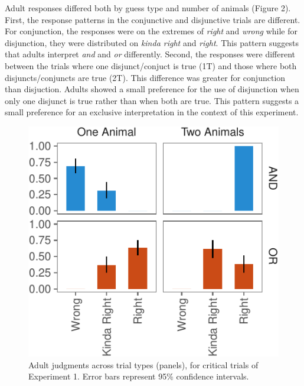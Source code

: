 \documentclass[10pt, letterpaper]{article}
\newenvironment{CodeChunk}{}{}
\begin{document}
Adult responses differed both by guess type and number of animals
(Figure 2). First, the response patterns in the conjunctive and
disjunctive trials are different. For conjunction, the responses were on
the extremes of \emph{right} and \emph{wrong} while for disjunction,
they were distributed on \emph{kinda right} and \emph{right}. This
pattern suggests that adults interpret \emph{and} and \emph{or}
differently. Second, the responses were different between the trials
where one disjunct/conjuct is true (1T) and those where both
disjuncts/conjuncts are true (2T). This difference was greater for
conjunction than disjuction. Adults showed a small preference for the
use of disjunction when only one disjunct is true rather than when both
are true. This pattern suggests a small preference for an exclusive
interpretation in the context of this experiment.

\begin{CodeChunk}
\begin{figure}[t]

{\centering \includegraphics{figs/plot-1} 

}

\caption[Adult judgments across trial types (panels), for critical trials of Experiment 1]{Adult judgments across trial types (panels), for critical trials of Experiment 1. Error bars represent 95\% confidence intervals.}\label{fig:plot}
\end{figure}
\end{CodeChunk}
\end{document}
